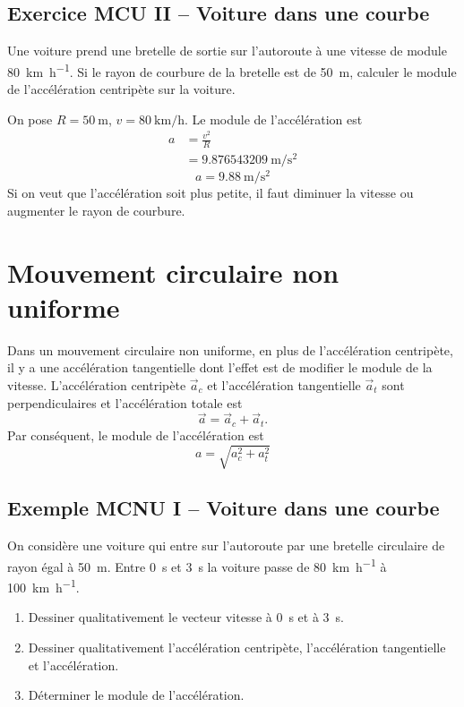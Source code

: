 \subsection{Exercice MCU II -- Voiture dans une courbe}

Une voiture prend une bretelle de sortie sur l'autoroute à une vitesse de
module \SI{80}{\kilo\meter\per\hour}.  Si le rayon de courbure de la bretelle
est de \SI{50}{\meter}, calculer le module de l'accélération centripète sur la
voiture.

On pose $R = \SI{50}{\meter}$, $v = \SI{80}{\kilo\meter\per\hour}$.  Le module
de l'accélération est
\begin{align*}
  a &= \frac{v^2}{R} \\
    &= \SI{9.876543209}{\meter\per\second\squared}
\end{align*}
\[
  \boxed{a = \SI{9.88}{\meter\per\second\squared}}
\]
Si on veut que l'accélération soit plus petite, il faut diminuer la vitesse ou
augmenter le rayon de courbure.


\section{Mouvement circulaire non uniforme}

Dans un mouvement circulaire non uniforme, en plus de l'accélération
centripète, il y a une accélération tangentielle dont l'effet est de modifier
le module de la vitesse.  L'accélération centripète $\vec{a}_c$ et
l'accélération tangentielle $\vec{a}_t$ sont perpendiculaires et l'accélération
totale est
\[
  \vec{a} = \vec{a}_c + \vec{a}_t.
\]
Par conséquent, le module de l'accélération est
\[
  a = \sqrt{a_c^2 + a_t^2}
\]


\subsection{Exemple MCNU I -- Voiture dans une courbe}

On considère une voiture qui entre sur l'autoroute par une bretelle circulaire
de rayon égal à \SI{50}{\meter}.  Entre \SI{0}{\second} et \SI{3}{\second} la
voiture passe de \SI{80}{\kilo\meter\per\hour} à \SI{100}{\kilo\meter\per\hour}.
\begin{enumerate}
  \item Dessiner qualitativement le vecteur vitesse à \SI{0}{\second} et à
    \SI{3}{\second}.
  \item Dessiner qualitativement l'accélération centripète, l'accélération
    tangentielle et l'accélération.
  \item Déterminer le module de l'accélération.
\end{enumerate}

